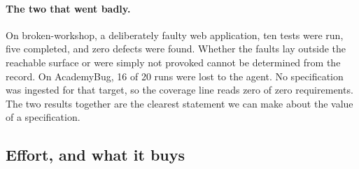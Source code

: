 \paragraph{The two that went badly.} On broken-workshop, a deliberately faulty
web application, ten tests were run, five completed, and zero defects were
found. Whether the faults lay outside the reachable surface or were simply not
provoked cannot be determined from the record. On AcademyBug, 16 of 20 runs
were lost to the agent. No specification was ingested for that target, so the
coverage line reads zero of zero requirements. The two results together are the
clearest statement we can make about the value of a specification.

\subsection{Effort, and what it buys}

